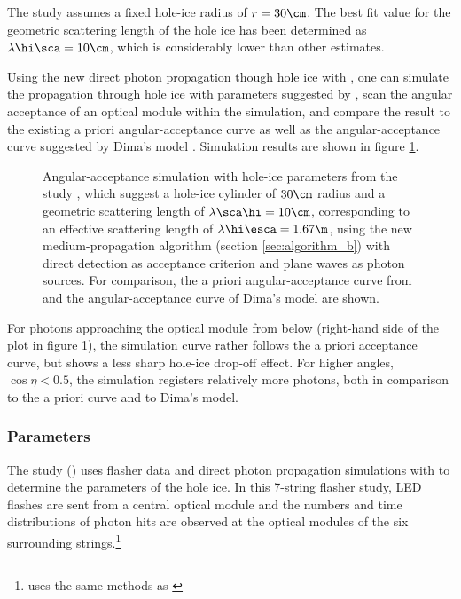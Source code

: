 The  study assumes a fixed hole-ice radius of $r=30\cm$. The best fit value for the geometric scattering length of the hole ice has been determined as $\lambda\hi\sca = 10\cm$, which is considerably lower than other estimates. \cite{martindardupdate}

Using the new direct photon propagation though hole ice with \clsim, one can simulate the propagation through hole ice with parameters suggested by , scan the angular acceptance of an optical module within the simulation, and compare the result to the existing a priori angular-acceptance curve \cite{icepaper} as well as the angular-acceptance curve suggested by Dima's model \cite{flasherdataderivedicemodels}.
Simulation results are shown in figure \ref{fig:eePai1sh}.


\begin{figure}[htbp]
  \caption{Angular-acceptance simulation with hole-ice parameters from the  study \cite{martindardupdate}, which suggest a hole-ice cylinder of $30\cm$ radius and a geometric scattering length of $\lambda\sca\hi = 10\cm$, corresponding to an effective scattering length of $\lambda\hi\esca = 1.67\m$, using the new medium-propagation algorithm (section \ref{sec:algorithm_b}) with direct detection as acceptance criterion and plane waves as photon sources. For comparison, the a priori angular-acceptance curve from \cite{icepaper} and the angular-acceptance curve of Dima's model \cite{flasherdataderivedicemodels} are shown.}
  \label{fig:eePai1sh}
\end{figure}

For photons approaching the optical module from below (right-hand side of the plot in figure \ref{fig:eePai1sh}), the simulation curve rather follows the a priori acceptance curve, but shows a less sharp hole-ice drop-off effect. For higher angles, $\cos\eta < 0.5$, the simulation registers relatively more photons, both in comparison to the a priori curve and to Dima's model.


\subsubsection{ Parameters}
\label{sec:spicehd_parameters}

The  study () uses flasher data and direct photon propagation simulations with \ppc to determine the parameters of the hole ice. In this 7-string flasher study, LED flashes are sent from a central optical module and the numbers and time distributions of photon hits are observed at the optical modules of the six surrounding strings.\footnote{ uses the same methods as \cite{icepaper,dimaslikelihood}}

